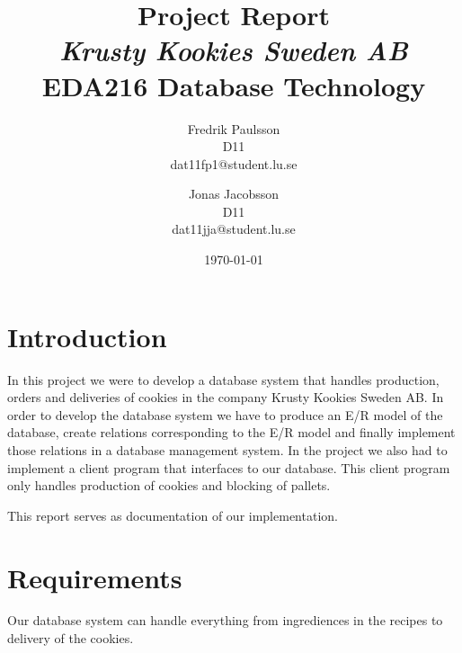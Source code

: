 \documentclass[a4paper]{article}
\title{Project Report \\ \emph{Krusty Kookies Sweden AB} \\ EDA216 Database Technology}
\date{\today}
\author{Fredrik Paulsson \\ D11 \\ dat11fp1@student.lu.se \and Jonas Jacobsson \\ D11 \\ dat11jja@student.lu.se}
\begin{document}
\maketitle
\newpage


\section{Introduction}
In this project we were to develop a database system that handles production, orders and deliveries of cookies in the company Krusty Kookies Sweden AB. In order to develop the database system we have to produce an E/R model of the database, create relations corresponding to the E/R model and finally implement those relations in a database management system. In the project we also had to implement a client program that interfaces to our database. This client program only handles production of cookies and blocking of pallets.

This report serves as documentation of our implementation. 

\section{Requirements}
Our database system can handle everything from ingrediences in the recipes to delivery of the cookies. 
\end{document}
